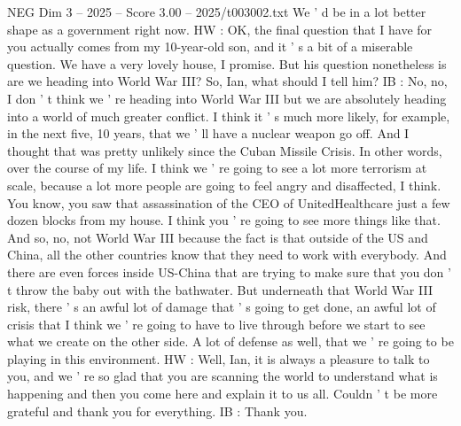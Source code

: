 \begin{textsample}{NEG Dim 3 – 2025 – Score 3.00 – 2025/t003002.txt}
We ' d be in a lot better shape as a government right now.
HW : OK, the final question that I have for you actually comes from my 10-year-old son, and it ' s a bit of a miserable question.
We have a very lovely house, I promise.
But his question nonetheless is are we heading into World War III?
So, Ian, what should I tell him?
IB : No, no, I don ' t think we ' re heading into World War III but we are absolutely heading into a world of much greater conflict.
I think it ' s much more likely, for example, in the next five, 10 years, that we ' ll have a nuclear weapon go off.
And I thought that was pretty unlikely since the Cuban Missile Crisis.
In other words, over the course of my life.
I think we ' re going to see a lot more terrorism at scale, because a lot more people are going to feel angry and disaffected, I think.
You know, you saw that assassination of the CEO of UnitedHealthcare just a few dozen blocks from my house.
I think you ' re going to see more things like that.
And so, no, not World War III because the fact is that outside of the US and China, all the other countries know that they need to work with everybody.
And there are even forces inside US-China that are trying to make sure that you don ' t throw the baby out with the bathwater.
But underneath that World War III risk, there ' s an awful lot of damage that ' s going to get done, an awful lot of crisis that I think we ' re going to have to live through before we start to see what we create on the other side.
A lot of defense as well, that we ' re going to be playing in this environment.
HW : Well, Ian, it is always a pleasure to talk to you, and we ' re so glad that you are scanning the world to understand what is happening and then you come here and explain it to us all.
Couldn ' t be more grateful and thank you for everything.
IB : Thank you.

\end{textsample}
